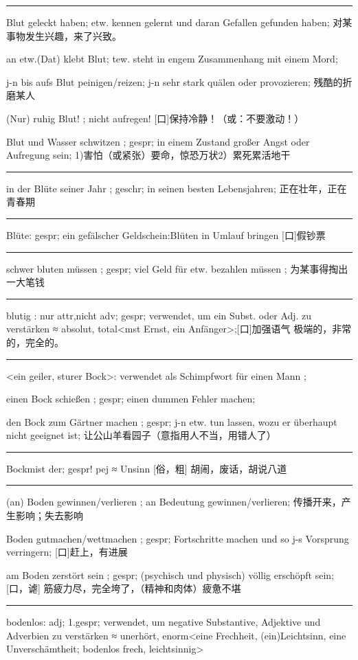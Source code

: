 \noindent\rule{\textwidth}{1pt} 
Blut geleckt haben; etw. kennen gelernt und daran Gefallen gefunden haben; 对某事物发生兴趣，来了兴致。

an etw.(Dat) klebt Blut; tew. steht in engem Zusammenhang mit einem Mord; 

j-n bis aufs Blut peinigen/reizen; j-n sehr stark quälen oder provozieren; 残酷的折磨某人

(Nur) ruhig Blut! ; nicht aufregen! [口]保持冷静！（或：不要激动！）

Blut und Wasser schwitzen ; gespr; in einem Zustand großer Angst oder Aufregung sein; 1)害怕（或紧张）要命，惊恐万状2）累死累活地干

\noindent\rule{\textwidth}{1pt} 
in der Blüte seiner Jahr ; geschr; in seinen besten Lebensjahren; 正在壮年，正在青春期

\noindent\rule{\textwidth}{1pt} 
Blüte: gespr; ein gefälscher Geldschein:Blüten in Umlauf bringen [口]假钞票

\noindent\rule{\textwidth}{1pt} 
schwer bluten müssen ; gespr; viel Geld für etw. bezahlen müssen ; 为某事得掏出一大笔钱

\noindent\rule{\textwidth}{1pt} 
blutig : nur attr,nicht adv; gespr; verwendet, um ein Subst. oder Adj. zu verstärken ≈ absolut, total\textless mst Ernst, ein Anfänger\textgreater ;[口]加强语气 极端的，非常的，完全的。

\noindent\rule{\textwidth}{1pt} 
\textless ein geiler, sturer Bock\textgreater  : verwendet als Schimpfwort für einen Mann ; 

einen Bock schießen ; gespr; einen dummen Fehler machen;

den Bock zum Gärtner machen ; gespr; j-n etw. tun lassen, wozu er überhaupt nicht geeignet ist; 让公山羊看园子（意指用人不当，用错人了）

\noindent\rule{\textwidth}{1pt} 
Bockmist der;  gespr! pej  ≈ Unsinn [俗，粗] 胡闹，废话，胡说八道

\noindent\rule{\textwidth}{1pt} 
(an) Boden gewinnen/verlieren ; an Bedeutung gewinnen/verlieren; 传播开来，产生影响；失去影响

Boden gutmachen/wettmachen ; gespr; Fortschritte machen und so j-s Vorsprung verringern; [口]赶上，有进展

am Boden zerstört sein ; gespr; (psychisch und physisch) völlig erschöpft sein;[口，谑] 筋疲力尽，完全垮了，（精神和肉体）疲惫不堪

\noindent\rule{\textwidth}{1pt} 
bodenlos: adj; 1.gespr; verwendet, um negative Substantive, Adjektive und Adverbien zu verstärken ≈ unerhört, enorm\textless eine Frechheit, (ein)Leichtsinn, eine Unverschämtheit; bodenlos frech, leichtsinnig\textgreater  

